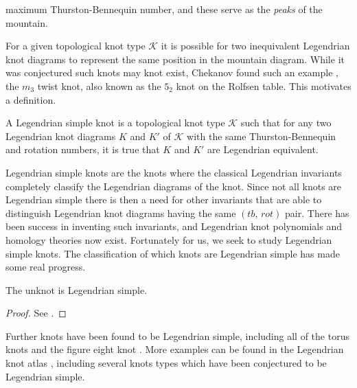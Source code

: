    maximum Thurston-Bennequin number, and these serve as the
    \textit{peaks} of the mountain.
    \par\hfill\par
    For a given topological knot type $\mathcal{K}$ it is possible for two
    inequivalent Legendrian knot diagrams to represent the same position in
    the mountain diagram. While it was conjectured such knots may knot exist,
    Chekanov found such an example \cite{ChekanovDifAlgOfLegLinks},
    the $m_{3}$ twist knot, also known as the $5_{2}$ knot on the Rolfsen
    table. This motivates a definition.
    \begin{definition}
        A Legendrian simple knot is a topological knot type $\mathcal{K}$
        such that for any two Legendrian knot diagrams $K$ and $K'$ of
        $\mathcal{K}$ with the same Thurston-Bennequin and rotation numbers,
        it is true that $K$ and $K'$ are Legendrian equivalent.
    \end{definition}
    Legendrian simple knots are the knots where the classical Legendrian
    invariants completely classify the Legendrian diagrams of the knot. Since
    not all knots are Legendrian simple there is then a need for other
    invariants that are able to distinguish Legendrian knot diagrams having
    the same $(tb,\,rot)$ pair. There has been success in inventing such
    invariants, and Legendrian knot polynomials and homology theories now
    exist. Fortunately for us, we seek to study Legendrian simple knots. The
    classification of which knots are Legendrian simple has made some real
    progress.
    \begin{theorem}
        The unknot is Legendrian simple.
    \end{theorem}
    \begin{proof}
        See \cite{EliashbergFraserClassificationTopTrivialLegKnots}.
    \end{proof}
    Further knots have been found to be Legendrian simple, including all of the
    torus knots and the figure eight knot \cite{EtnyreHondaContactTopologyI}.
    More examples can be found in the Legendrian knot atlas
    \cite{LegendrianKnotAtlas}, including several knots types which have been
    conjectured to be Legendrian simple.
